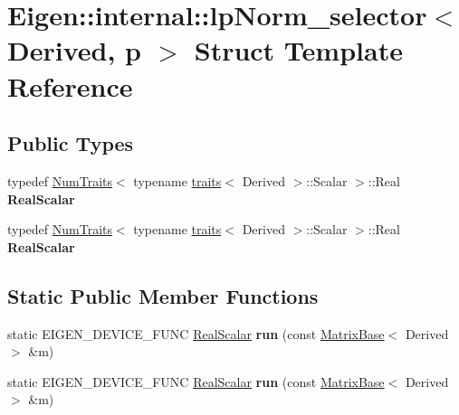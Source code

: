 \hypertarget{struct_eigen_1_1internal_1_1lp_norm__selector}{}\section{Eigen\+:\+:internal\+:\+:lp\+Norm\+\_\+selector$<$ Derived, p $>$ Struct Template Reference}
\label{struct_eigen_1_1internal_1_1lp_norm__selector}
\subsection*{Public Types}
\begin{DoxyCompactItemize}
\item 
\mbox{\label{struct_eigen_1_1internal_1_1lp_norm__selector_a81758e3978ec7c77154e3a7f2bc29eca}} 
typedef \hyperlink{group___core___module_struct_eigen_1_1_num_traits}{Num\+Traits}$<$ typename \hyperlink{struct_eigen_1_1internal_1_1traits}{traits}$<$ Derived $>$\+::Scalar $>$\+::Real {\bfseries Real\+Scalar}
\item 
\mbox{\label{struct_eigen_1_1internal_1_1lp_norm__selector_a81758e3978ec7c77154e3a7f2bc29eca}} 
typedef \hyperlink{group___core___module_struct_eigen_1_1_num_traits}{Num\+Traits}$<$ typename \hyperlink{struct_eigen_1_1internal_1_1traits}{traits}$<$ Derived $>$\+::Scalar $>$\+::Real {\bfseries Real\+Scalar}
\end{DoxyCompactItemize}
\subsection*{Static Public Member Functions}
\begin{DoxyCompactItemize}
\item 
\mbox{\label{struct_eigen_1_1internal_1_1lp_norm__selector_a0b5f864c870840d664e36fa33239aed8}} 
static E\+I\+G\+E\+N\+\_\+\+D\+E\+V\+I\+C\+E\+\_\+\+F\+U\+NC \hyperlink{group___sparse_core___module}{Real\+Scalar} {\bfseries run} (const \hyperlink{group___core___module_class_eigen_1_1_matrix_base}{Matrix\+Base}$<$ Derived $>$ \&m)
\item 
\mbox{\label{struct_eigen_1_1internal_1_1lp_norm__selector_a0b5f864c870840d664e36fa33239aed8}} 
static E\+I\+G\+E\+N\+\_\+\+D\+E\+V\+I\+C\+E\+\_\+\+F\+U\+NC \hyperlink{group___sparse_core___module}{Real\+Scalar} {\bfseries run} (const \hyperlink{group___core___module_class_eigen_1_1_matrix_base}{Matrix\+Base}$<$ Derived $>$ \&m)
\end{DoxyCompactItemize}


